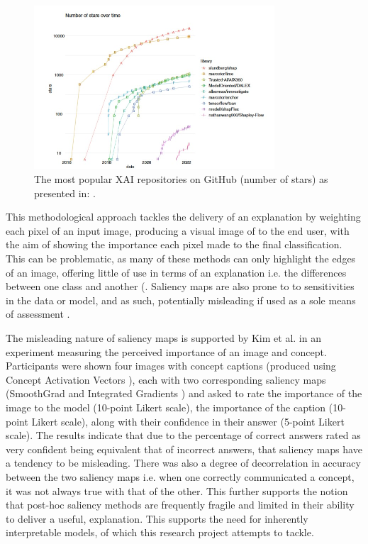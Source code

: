 \begin{figure}[H]
  \centering
    \includegraphics[width=0.8\textwidth]{images/most popular XAI toolboxes - GitHub Stars - xxAI 2022.jpg}
  \caption{The most popular XAI repositories on GitHub (number of stars) as presented in: \cite{holzingerXxAIExplainableAI2022a}.}\label{fig:Popular XAI Tool}
\end{figure}

This methodological approach tackles the delivery of an explanation by weighting each pixel of an input image, producing a visual image of to the end user, with the aim of showing the importance each pixel made to the final classification. This can be problematic, as many of these methods can only highlight the edges of an image, offering little of use in terms of an explanation i.e. the differences between one class and another (\cite{rudinStopExplainingBlack2019}. Saliency maps are also prone to to sensitivities in the data or model, and as such, potentially misleading if used as a sole means of assessment \cite{adebayoSanityChecksSaliency2018a}.

The misleading nature of saliency maps is supported by Kim et al. \cite{kimInterpretabilityFeatureAttribution2018} in an experiment measuring the perceived importance of an image and concept. Participants were shown four images with concept captions (produced using Concept Activation Vectors \cite{kimInterpretabilityFeatureAttribution2018}), each with two corresponding saliency maps (SmoothGrad \cite{smilkovSmoothGradRemovingNoise2017} and Integrated Gradients \cite{adebayoSanityChecksSaliency2018a}) and asked to rate the importance of the image to the model (10-point Likert scale), the importance of the caption (10-point Likert scale), along with their confidence in their answer (5-point Likert scale). The results indicate that due to the percentage of correct answers rated as very confident being equivalent that of incorrect answers, that saliency maps have a tendency to be misleading. There was also a degree of decorrelation in accuracy between the two saliency maps i.e. when one correctly communicated a concept, it was not always true with that of the other. This further supports the notion that post-hoc saliency methods are frequently fragile and limited in their ability to deliver a useful, explanation. This supports the need for inherently interpretable models, of which this research project attempts to tackle.

